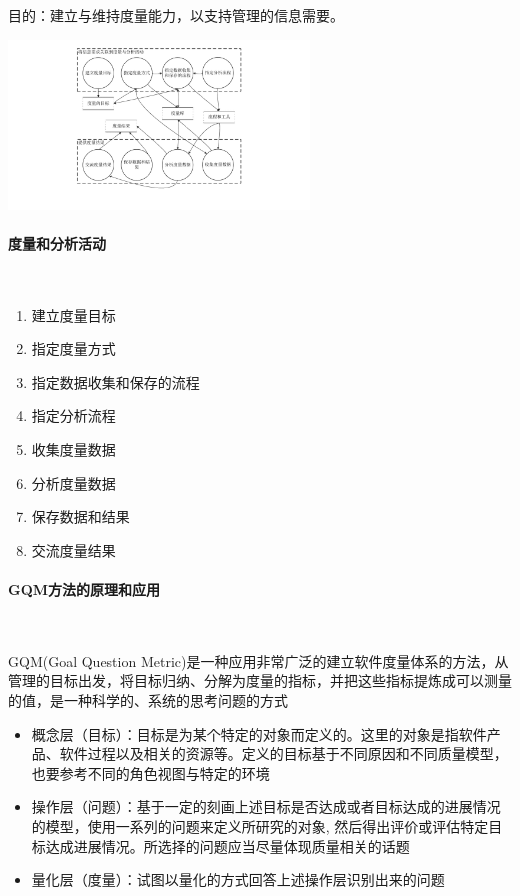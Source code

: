 目的：建立与维持度量能力，以支持管理的信息需要。

\begin{table}
    \centering
    \vspace{-2em}
    \includegraphics[width=0.6\textwidth]{images/度量与分析活动.pdf}
    \vspace{-7em}
\end{table}
\paragraph{度量和分析活动}~{} \par
\begin{enumerate}[label=\arabic*.]
    \item 建立度量目标
    \item 指定度量方式
    \item 指定数据收集和保存的流程
    \item 指定分析流程
    \item 收集度量数据
    \item 分析度量数据
    \item 保存数据和结果
    \item 交流度量结果
\end{enumerate}

\paragraph{GQM方法的原理和应用}~{} \par
GQM(Goal Question Metric)是一种应用非常广泛的建立软件度量体系的方法，从管理的目标出发，将目标归纳、分解为度量的指标，并把这些指标提炼成可以测量的值，是一种科学的、系统的思考问题的方式
\begin{itemize}
    \item 概念层（目标）：目标是为某个特定的对象而定义的。这里的对象是指软件产品、软件过程以及相关的资源等。定义的目标基于不同原因和不同质量模型，也要参考不同的角色视图与特定的环境
    \item 操作层（问题）：基于一定的刻画上述目标是否达成或者目标达成的进展情况的模型，使用一系列的问题来定义所研究的对象, 然后得出评价或评估特定目标达成进展情况。所选择的问题应当尽量体现质量相关的话题
    \item 量化层（度量）：试图以量化的方式回答上述操作层识别出来的问题
\end{itemize}

